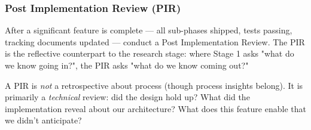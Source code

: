 \documentclass[11pt]{article}
\begin{document}
\subsubsection{Post Implementation Review (PIR)}
\label{sec:org5e44967}

After a significant feature is complete --- all sub-phases shipped, tests
passing, tracking documents updated --- conduct a Post Implementation
Review. The PIR is the reflective counterpart to the research stage: where
Stage 1 asks "what do we know going in?", the PIR asks "what do we know
coming out?"

A PIR is \emph{not} a retrospective about process (though process insights
belong). It is primarily a \emph{technical} review: did the design hold up?
What did the implementation reveal about our architecture? What does
this feature enable that we didn't anticipate?
\end{document}

